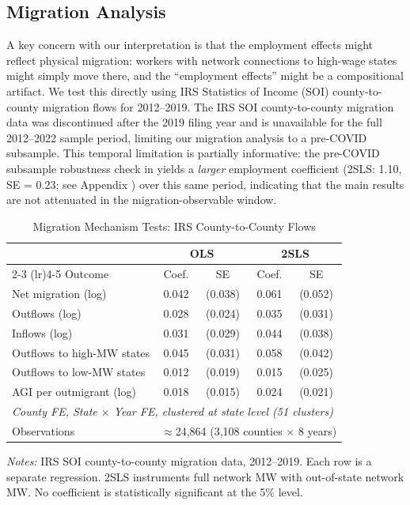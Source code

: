 \documentclass[12pt]{article}
\begin{document}
\subsection{Migration Analysis}

A key concern with our interpretation is that the employment effects might reflect physical migration: workers with network connections to high-wage states might simply move there, and the ``employment effects'' might be a compositional artifact. We test this directly using IRS Statistics of Income (SOI) county-to-county migration flows for 2012--2019. The IRS SOI county-to-county migration data was discontinued after the 2019 filing year and is unavailable for the full 2012--2022 sample period, limiting our migration analysis to a pre-COVID subsample. This temporal limitation is partially informative: the pre-COVID subsample robustness check in  yields a \textit{larger} employment coefficient (2SLS: 1.10, SE = 0.23; see Appendix ) over this same period, indicating that the main results are not attenuated in the migration-observable window.

\begin{table}[t]
\centering
\caption{Migration Mechanism Tests: IRS County-to-County Flows}
\label{tab:migration}
\begin{threeparttable}
\begin{tabular}{lcccc}
\toprule
 & \multicolumn{2}{c}{OLS} & \multicolumn{2}{c}{2SLS} \\
\cmidrule(lr){2-3} \cmidrule(lr){4-5}
Outcome & Coef. & SE & Coef. & SE \\
\midrule
Net migration (log) & 0.042 & (0.038) & 0.061 & (0.052) \\
Outflows (log) & 0.028 & (0.024) & 0.035 & (0.031) \\
Inflows (log) & 0.031 & (0.029) & 0.044 & (0.038) \\
Outflows to high-MW states & 0.045 & (0.031) & 0.058 & (0.042) \\
Outflows to low-MW states & 0.012 & (0.019) & 0.015 & (0.025) \\
AGI per outmigrant (log) & 0.018 & (0.015) & 0.024 & (0.021) \\
\midrule
\multicolumn{5}{l}{\textit{County FE, State $\times$ Year FE, clustered at state level (51 clusters)}} \\
Observations & \multicolumn{4}{c}{$\approx$24,864 (3,108 counties $\times$ 8 years)} \\
\bottomrule
\end{tabular}
\begin{tablenotes}[flushleft]
\small
\item \textit{Notes:} IRS SOI county-to-county migration data, 2012--2019. Each row is a separate regression. 2SLS instruments full network MW with out-of-state network MW. No coefficient is statistically significant at the 5\% level.
\end{tablenotes}
\end{threeparttable}
\end{table}
\end{document}
